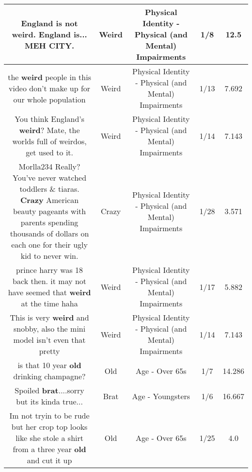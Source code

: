 \documentclass[11pt]{article}
\newlength\mylength
\begin{document}
\begin{center}
\begin{longtable}{|C{.65\mylength}|C{.30\mylength}|C{.12\mylength}|C{.12\mylength}|C{.12\mylength}|}
  \small England is not \textbf{weird}. England is... MEH CITY.\normalsize   & Weird & Physical Identity - Physical (and Mental) Impairments & 1/8 & 12.5 \\  \hline
  \small the \textbf{weird} people in this video don't make up for our whole population\normalsize   & Weird & Physical Identity - Physical (and Mental) Impairments & 1/13 & 7.692 \\  \hline
  \small You think England's \textbf{weird}? Mate, the worlds full of weirdos, get used to it.\normalsize   & Weird & Physical Identity - Physical (and Mental) Impairments & 1/14 & 7.143 \\  \hline
  \small Morlla234 Really? You've never watched toddlers \& tiaras. \textbf{Crazy} American beauty pageants with  parents spending thousands of dollars on each one for their ugly kid to never win.\normalsize   & Crazy & Physical Identity - Physical (and Mental) Impairments & 1/28 & 3.571 \\  \hline
  \small prince harry was 18 back then. it may not have seemed that \textbf{weird} at the time haha\normalsize   & Weird & Physical Identity - Physical (and Mental) Impairments & 1/17 & 5.882 \\  \hline
  \small This is very \textbf{weird} and snobby, also the mini model isn't even that pretty\normalsize   & Weird & Physical Identity - Physical (and Mental) Impairments & 1/14 & 7.143 \\  \hline
  \small is that 10 year \textbf{old} drinking champagne?\normalsize   & Old & Age - Over 65s & 1/7 & 14.286 \\  \hline
  \small Spoiled \textbf{brat}....sorry but its kinda true...\normalsize   & Brat & Age - Youngsters & 1/6 & 16.667 \\  \hline
  \small Im not tryin to be rude but her crop top looks like she stole a shirt from a three year \textbf{old} and cut it up\normalsize   & Old & Age - Over 65s & 1/25 & 4.0 \\  \hline

\end{longtable}
\end{center}
\end{document}
